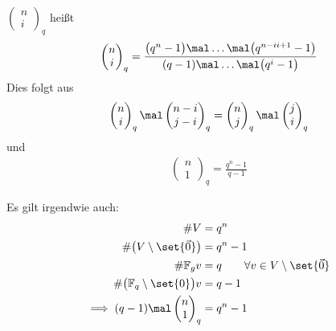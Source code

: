 \begin{bemerkungnr}
	$\begin{pmatrix}
		n\\
		i
	\end{pmatrix}_q$ heißt 
	\begin{align*}
		\begin{pmatrix}
			n\\
			i
		\end{pmatrix}_q
		=\frac{
			\big(q^n-1\big)\mal\ldots\mal\big(q^{n-ii+1}-1\big)
		}{
			(q-1)\mal\ldots\mal\big(q^i-1\big)
		}
	\end{align*}
	Dies folgt aus
	\begin{align*}
		\begin{pmatrix}
			n\\
			i
		\end{pmatrix}_q\mal\begin{pmatrix}
			n-i\\
			j-i
		\end{pmatrix}_q
		=\begin{pmatrix}
			n\\
			j
		\end{pmatrix}_q\mal\begin{pmatrix}
			j\\
			i
		\end{pmatrix}_q
	\end{align*}
	und 
	\begin{align*}
		\begin{pmatrix}
			n\\
			1
		\end{pmatrix}_q=\frac{q^n-1}{q-1}
	\end{align*}
	
	Es gilt irgendwie auch:
	\begin{align*}
		\#V&=q^n\\
		\#\big(V\setminus\set{\vec{0}}\big)&=q^n-1\\
		\#\F_g v&=q\qquad\forall v\in V\setminus\set{\vec{0}}\\
		\#\big(\F_q\setminus\set{0}\big)v&=q-1\\
		\implies (q-1)\mal\begin{pmatrix}
			n\\
			1
		\end{pmatrix}_q&=q^n-1
	\end{align*}
\end{bemerkungnr}


